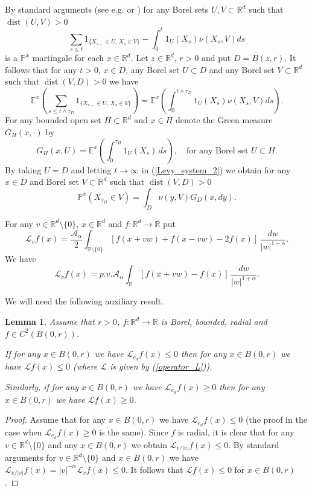 \documentclass[a4paper,12pt,reqno]{amsart}
\newtheorem{lemma}[theorem]{Lemma}
\theoremstyle{definition}
\theoremstyle{remark}
\newcommand{\Aa}{\mathcal{A}_{\alpha}}
\newcommand{\calL}{\mathcal{L}}
\newcommand{\Ee}{\mathds{E}} %
\newcommand{\Pp}{\mathds{P}} %
\newcommand{\R}{\mathds{R}}
\newcommand{\Rd}{\mathds{R}^d}
\DeclareMathOperator{\dist}{dist}
\begin{document}
By standard arguments (see e.g. \cite[Proposition 2.3]{BL2002} or \cite[pages 39-40]{CK2003}) for any Borel sets $U, V \subset \R^d$ such that $\dist(U,V) > 0$ 
\begin{equation*}
\sum_{s \le t} 1_{\{X_{s-} \in U, \, X_s \in V\}} - 
\int_0^t 1_U(X_s) \nu(X_s,V) ds
\end{equation*}
is a $\Pp^x$ martingale for each $x \in \R^d$. Let $z \in \R^d$, $r > 0$ and put $D = B(z,r)$. It follows that for any $t > 0$, $x \in D$, any Borel set $U \subset D$ and any Borel set $V \subset \Rd$ such that $\dist(V,D) > 0$ we have
\begin{equation}
\label{Levy_system_2}
\Ee^x\left(\sum_{s \le t \wedge \tau_D} 1_{\{X_{s-} \in U, \, X_s \in V\}}\right) = \Ee^x\left(\int_0^{t \wedge \tau_D} 1_U(X_s) \nu(X_s,V) ds \right).
\end{equation}
For any bounded open set $H \subset \R^d$ and $x \in H$ denote the Green measure $G_H(x,\cdot)$ by
$$
G_H(x,U) = \Ee^x\left(\int_0^{\tau_H} 1_U(X_s) \, ds\right), \quad \text{for any Borel set $U \subset H$.} 
$$
By taking $U = D$ and letting $t \to \infty$ in (\ref{Levy_system_2}) we obtain for any $x \in D$ and Borel set $V \subset \Rd$ such that $\dist(V,D) > 0$
\begin{equation}
\label{Levy_system_3}
\Pp^x(X_{\tau_D} \in V) = \int_D  \nu(y,V) G_D(x,dy).
\end{equation}

For any $v \in \R^d \setminus \{0\}$, $x \in \R^d$ and $f:\R^d \to \R$ put
\begin{equation}
\label{calL_v}
\calL_v f(x) = \frac{\Aa}{2}  \int_{\R \setminus \{0\}} \left[f(x + v w) + f(x - v w) - 2f(x) \right] \, \frac{dw}{|w|^{1 + \alpha}}.
\end{equation}
We have
$$
\calL_v f(x) = p.v. \Aa \int_{\R} \left[f(x + v w) - f(x) \right] \, \frac{dw}{|w|^{1 + \alpha}}.
$$
 
We will need the following auxiliary result.
\begin{lemma}
\label{lemma_L_e_d}
Assume that $r > 0$, $f: \R^d \to \R$ is Borel, bounded, radial and $f \in C^2(B(0,r))$. 

If for any $x \in B(0,r)$ we have $\calL_{e_d} f(x) \le 0$ then for any $x \in B(0,r)$ we have $\calL f(x) \le 0$ (where $\calL$ is given by (\ref{operator_L})). 

Similarly, if for any $x \in B(0,r)$ we have $\calL_{e_d} f(x) \ge 0$ then for any $x \in B(0,r)$ we have $\calL f(x) \ge 0$. 
\end{lemma}
\begin{proof}
Assume that for any $x \in B(0,r)$ we have $\calL_{e_d} f(x) \le 0$ (the proof in the case when $\calL_{e_d} f(x) \ge 0$ is the same). Since $f$ is radial, it is clear that for any $v \in \R^d \setminus \{0\}$ and any $x \in B(0,r)$ we obtain $\calL_{v/|v|} f(x) \le 0$. By standard arguments for $v \in \R^d \setminus \{0\}$ and $x \in B(0,r)$ we have $\calL_{v/|v|} f(x) = |v|^{-\alpha} \calL_{v} f(x) \le 0$. It follows that $\calL f(x) \le 0$ for $x \in B(0,r)$.
\end{proof}
\end{document}
